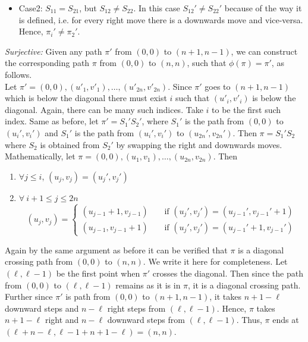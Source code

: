 \begin{description}
\begin{itemize}
    \item Case2: $S_{11}= S_{21}$, but $S_{12}\ne S_{22}$. In this case $S_{12}'\ne S_{22}'$ because of the way it is defined, i.e. for every right move there is a downwards move and vice-versa. Hence, $\pi_i'\ne \pi_2'$.
\end{itemize}
\item \textit{Surjective:} Given any path $\pi'$ from  $(0,0)$ to $(n+1,n-1)$, we can construct the corresponding path $\pi$ from $(0,0)$ to $(n,n)$, such that $\phi(\pi) = \pi'$, as follows.\\
Let $\pi'=(0,0), (u'_1,v'_1), \ldots, (u'_{2n}, v'_{2n})$. Since $\pi'$ goes to $(n+1, n-1)$ which is below the diagonal there must exist $i$ such that $(u'_i,v'_i)$ is below the diagonal. Again, there can be many such indices. Take $i$ to be the first such index. Same as before, let $\pi' = S_1'S_2'$, where $S_1'$ is the path from $(0,0)$ to $(u_i', v_i')$ and  $S_1'$ is the path from $(u_i',v_i')$ to $(u_{2n}', v_{2n}')$. Then $\pi = S_1'S_2$ where $S_2$ is obtained from $S_2'$ by swapping the right and downwards moves. Mathematically, let $\pi=(0,0), (u_1,v_1), \ldots, (u_{2n}, v_{2n})$. Then
\begin{enumerate}
    \item $\forall j\le i$, $(u_j, v_j) = (u_j', v_j')$
    \item $\forall~i+1\le j\le 2n$
    \[
    (u_j, v_j) =
    \begin{cases}
    (u_{j-1}+1, v_{j-1}) & ~~~~~\text{if } (u_j', v_j') = (u_{j-1}', v_{j-1}'+1)\\
    (u_{j-1}, v_{j-1}+1) & ~~~~~\text{if } (u_j', v_j') = (u_{j-1}'+1, v_{j-1}')
    \end{cases}
    \]
\end{enumerate}
Again by the same argument as before it can be verified that $\pi$ is a diagonal crossing path from $(0,0)$ to $(n,n)$. We write it here for completeness. Let $(\ell, \ell-1)$ be the first point when $\pi'$ crosses the diagonal. Then since the path from $(0,0)$ to $(\ell, \ell-1)$ remains as it is in $\pi$, it is a diagonal crossing path. Further since $\pi'$ is path from $(0,0)$ to $(n+1, n-1)$, it takes $n+1-\ell$ downward steps and $n-\ell$ right steps from $(\ell, \ell-1)$. Hence, $\pi$ takes $n+1-\ell$ right and $n-\ell$ downward steps from $(\ell, \ell-1)$. Thus, $\pi$ ends at $(\ell+n-\ell, \ell-1+n+1-\ell) = (n,n)$. 
\end{description}


